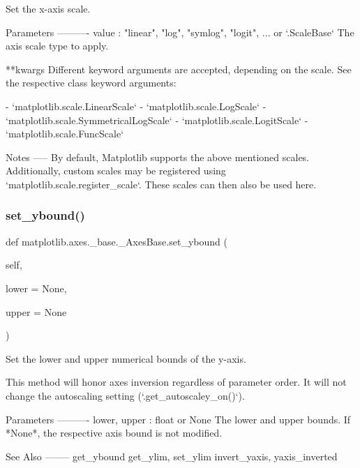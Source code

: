 \begin{DoxyVerb}Set the x-axis scale.

Parameters
----------
value : {"linear", "log", "symlog", "logit", ...} or `.ScaleBase`
    The axis scale type to apply.

**kwargs
    Different keyword arguments are accepted, depending on the scale.
    See the respective class keyword arguments:

    - `matplotlib.scale.LinearScale`
    - `matplotlib.scale.LogScale`
    - `matplotlib.scale.SymmetricalLogScale`
    - `matplotlib.scale.LogitScale`
    - `matplotlib.scale.FuncScale`

Notes
-----
By default, Matplotlib supports the above mentioned scales.
Additionally, custom scales may be registered using
`matplotlib.scale.register_scale`. These scales can then also
be used here.
\end{DoxyVerb}
 \mbox{\label{classmatplotlib_1_1axes_1_1__base_1_1__AxesBase_a3dc4aafb934e8c9e38c37a8e2151339f}} 
\subsubsection{\texorpdfstring{set\+\_\+ybound()}{set\_ybound()}}
{\footnotesize\ttfamily def matplotlib.\+axes.\+\_\+base.\+\_\+\+Axes\+Base.\+set\+\_\+ybound (\begin{DoxyParamCaption}\item[{}]{self,  }\item[{}]{lower = {\ttfamily None},  }\item[{}]{upper = {\ttfamily None} }\end{DoxyParamCaption})}

\begin{DoxyVerb}Set the lower and upper numerical bounds of the y-axis.

This method will honor axes inversion regardless of parameter order.
It will not change the autoscaling setting (`.get_autoscaley_on()`).

Parameters
----------
lower, upper : float or None
    The lower and upper bounds. If *None*, the respective axis bound
    is not modified.

See Also
--------
get_ybound
get_ylim, set_ylim
invert_yaxis, yaxis_inverted
\end{DoxyVerb}
 \mbox{\label{classmatplotlib_1_1axes_1_1__base_1_1__AxesBase_ae1538e499bd741bd1dde24477c43b610}} 
